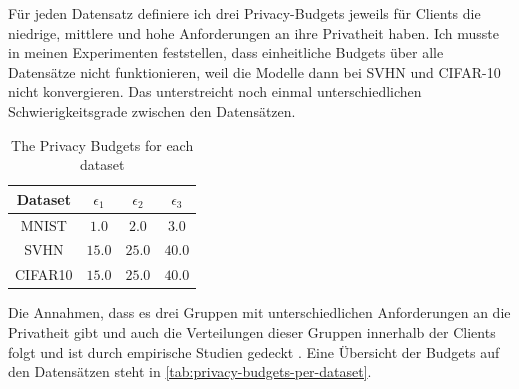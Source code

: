 Für jeden Datensatz definiere ich drei Privacy-Budgets jeweils für Clients die niedrige, mittlere und hohe Anforderungen an ihre Privatheit haben. Ich musste in meinen Experimenten feststellen, dass einheitliche Budgets über alle Datensätze nicht funktionieren, weil die Modelle dann bei SVHN und CIFAR-10 nicht konvergieren. Das unterstreicht noch einmal unterschiedlichen Schwierigkeitsgrade zwischen den Datensätzen.

\begin{table}[tb]
	\centering
	\begin{tabular}{|c|c|c|c|}
		\hline
		Dataset & $\epsilon_1$ & $\epsilon_2$ & $\epsilon_3$ \\
		\hline
		MNIST & $1.0$ & $2.0$ & $3.0$ \\
		SVHN & $15.0$ & $25.0$ & $40.0$ \\
		CIFAR10 & $15.0$ & $25.0$ & $40.0$ \\
		\hline
	\end{tabular}
	\caption{The Privacy Budgets for each dataset}
	\label{tab:privacy-budgets-per-dataset}
\end{table}

Die Annahmen, dass es drei Gruppen mit unterschiedlichen Anforderungen an die Privatheit gibt und auch die Verteilungen dieser Gruppen innerhalb der Clients folgt \textcite{boenisch:2023} und ist durch empirische Studien gedeckt \cite{jensen:2005, acquisti:2005}. Eine Übersicht der Budgets auf den Datensätzen steht in \autoref{tab:privacy-budgets-per-dataset}.



